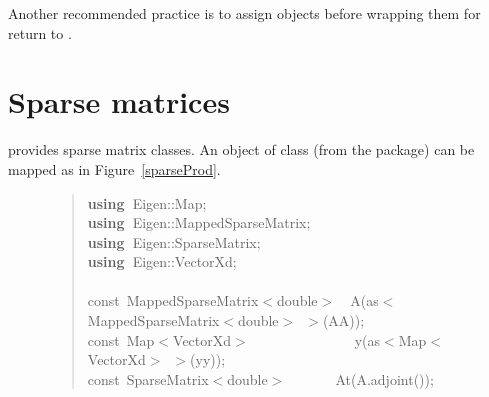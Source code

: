 \documentclass[shortnames,article]{jss}
\newcommand{\hlstd}[1]{\textcolor[rgb]{0,0,0}{#1}}
\newcommand{\hlopt}[1]{\textcolor[rgb]{0,0,0}{#1}}
\newcommand{\hlkwa}[1]{\textcolor[rgb]{0.61,0.13,0.93}{\bf{#1}}}
\newcommand{\hlkwb}[1]{\textcolor[rgb]{0.13,0.54,0.13}{#1}}
\newcommand{\hlkwd}[1]{\textcolor[rgb]{0,0,0}{#1}}
\begin{document}
Another recommended practice is to assign objects before wrapping them
for return to .

\section{Sparse matrices}
\label{sec:sparse}

 provides sparse matrix classes.  An  object of
class  (from the 
\citep{CRAN:Matrix} package) can be mapped as in Figure~\ref{sparseProd}.

\begin{figure}[htb]
  \begin{quote}
    \noindent
    \ttfamily
    \hlstd{}\hlkwa{using\ }\hlstd{Eigen}\hlopt{::}\hlstd{Map}\hlopt{;}\hspace*{\fill}\\
    \hlstd{}\hlkwa{using\ }\hlstd{Eigen}\hlopt{::}\hlstd{MappedSparseMatrix}\hlopt{;}\hspace*{\fill}\\
    \hlstd{}\hlkwa{using\ }\hlstd{Eigen}\hlopt{::}\hlstd{SparseMatrix}\hlopt{;}\hspace*{\fill}\\
    \hlstd{}\hlkwa{using\ }\hlstd{Eigen}\hlopt{::}\hlstd{VectorXd}\hlopt{;}\hspace*{\fill}\\
    \hlstd{}\hspace*{\fill}\\
    \hlkwb{const\ }\hlstd{MappedSparseMatrix}\hlopt{$<$}\hlstd{}\hlkwb{double}\hlstd{}\hlopt{$>$}\hlstd{\ \ }\hlopt{}\hlstd{}\hlkwd{A}\hlstd{}\hlopt{(}\hlstd{as}\hlopt{$<$}\hlstd{MappedSparseMatrix}\hlopt{$<$}\hlstd{}\hlkwb{double}\hlstd{}\hlopt{$>$\ $>$(}\hlstd{AA}\hlopt{));}\hspace*{\fill}\\
    \hlstd{}\hlkwb{const\ }\hlstd{Map}\hlopt{$<$}\hlstd{VectorXd}\hlopt{$>$}\hlstd{\ \ \ \ \ \ \ \ \ \ \ \ \ \ \ }\hlopt{}\hlstd{}\hlkwd{y}\hlstd{}\hlopt{(}\hlstd{as}\hlopt{$<$}\hlstd{Map}\hlopt{$<$}\hlstd{VectorXd}\hlopt{$>$\ $>$(}\hlstd{yy}\hlopt{));}\hspace*{\fill}\\
    \hlstd{}\hlkwb{const\ }\hlstd{SparseMatrix}\hlopt{$<$}\hlstd{}\hlkwb{double}\hlstd{}\hlopt{$>$}\hlstd{\ \ \ \ \ \ \ }\hlopt{}\hlstd{}\hlkwd{At}\hlstd{}\hlopt{(}\hlstd{A}\hlopt{.}\hlstd{}\hlkwd{adjoint}\hlstd{}\hlopt{());}\hspace*{\fill}\\

\end{quote}
\end{figure}
\end{document}
